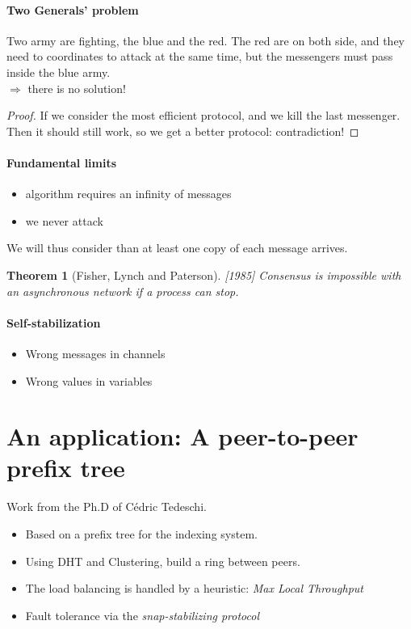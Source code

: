 \documentclass{article}
\newtheorem{thm}{Theorem}
\begin{document}
\paragraph{Two Generals' problem}
Two army are fighting, the blue and the red. The red are on both side, and they need to coordinates to attack at the same time, but the messengers must pass inside the blue army.\\
$\Rightarrow$ there is no solution!

\begin{proof}
If we consider the most efficient protocol, and we kill the last messenger. Then it should still work, so we get a better protocol: contradiction!
\end{proof}

\paragraph{Fundamental limits}
\begin{itemize}[noitemsep]
\item algorithm requires an infinity of messages
\item we never attack
\end{itemize}

We will thus consider than at least one copy of each message arrives.

\begin{thm}[Fisher, Lynch and Paterson][1985]
	Consensus is impossible with an asynchronous network if a process can stop.
\end{thm}



\paragraph{Self-stabilization}
\begin{itemize}[noitemsep]
\item Wrong messages in channels
\item Wrong values in variables
\end{itemize}



\section{An application: A peer-to-peer prefix tree}
Work from the Ph.D of Cédric Tedeschi.

\begin{itemize}
\item Based on a prefix tree for the indexing system.
\item Using DHT and Clustering, build a ring between peers.
\item The load balancing is handled by a heuristic: \emph{Max Local Throughput}
\item Fault tolerance via the \emph{snap-stabilizing protocol}
\end{itemize}
\end{document}
